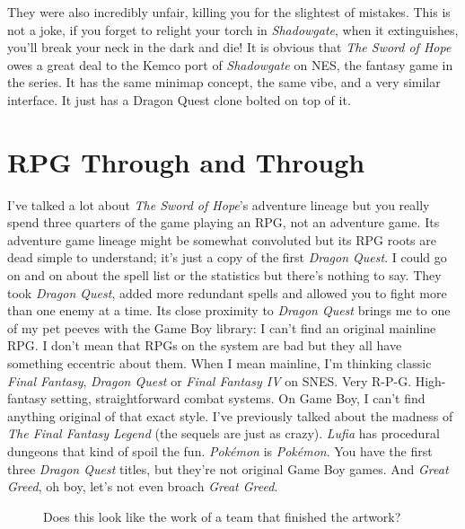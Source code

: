 \documentclass{book}
\begin{document}
\FloatBarrier\vspace{\baselineskip}\begin{figure}[H]\end{figure}
They were also incredibly unfair, killing you for the slightest of mistakes. This is not a joke, if you forget to relight your torch in \emph{Shadowgate}, when it extinguishes, you’ll break your neck in the dark and die! It is obvious that \emph{The Sword of Hope} owes a great deal to the Kemco port of \emph{Shadowgate} on NES, the fantasy game in the series. It has the same minimap concept, the same vibe, and a very similar interface. It just has a Dragon Quest clone bolted on top of it.\par
\FloatBarrier\section*{RPG Through and Through}
I’ve talked a lot about \emph{The Sword of Hope}’s adventure lineage but you really spend three quarters of the game playing an RPG, not an adventure game. Its adventure game lineage might be somewhat convoluted but its RPG roots are dead simple to understand; it’s just a copy of the first \emph{Dragon Quest}. I could go on and on about the spell list or the statistics but there’s nothing to say. They took \emph{Dragon Quest}, added more redundant spells and allowed you to fight more than one enemy at a time. Its close proximity to \emph{Dragon Quest} brings me to one of my pet peeves with the Game Boy library: I can’t find an original mainline RPG. I don’t mean that RPGs on the system are bad but they all have something eccentric about them. When I mean mainline, I’m thinking classic \emph{Final Fantasy}, \emph{Dragon Quest} or \emph{Final Fantasy IV} on SNES. Very R-P-G. High-fantasy setting, straightforward combat systems. On Game Boy, I can’t find anything original of that exact style. I’ve previously talked about the madness of \emph{The Final Fantasy Legend} (the sequels are just as crazy). \emph{Lufia} has procedural dungeons that kind of spoil the fun. \emph{Pokémon} is \emph{Pokémon}. You have the first three \emph{Dragon Quest} titles, but they’re not original Game Boy games. And \emph{Great Greed}, oh boy, let’s not even broach \emph{Great Greed}.\par
\FloatBarrier\vspace{\baselineskip}\begin{figure}[H]\caption*{Does this look like the work of a team that finished the artwork?}\end{figure}
\end{document}
